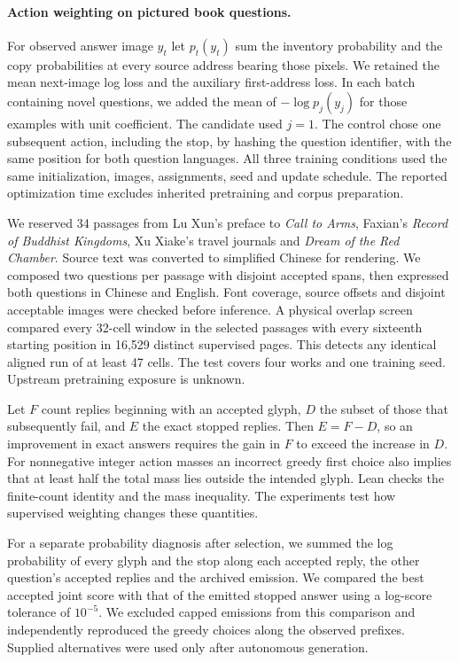 \paragraph{Action weighting on pictured book questions.}
For observed answer image $y_t$ let $p_t(y_t)$ sum the inventory probability and the copy probabilities at every source address bearing those pixels. We retained the mean next-image log loss and the auxiliary first-address loss. In each batch containing novel questions, we added the mean of $-\log p_j(y_j)$ for those examples with unit coefficient. The candidate used $j=1$. The control chose one subsequent action, including the stop, by hashing the question identifier, with the same position for both question languages. All three training conditions used the same initialization, images, assignments, seed and update schedule. The reported optimization time excludes inherited pretraining and corpus preparation.

We reserved 34 passages from Lu Xun's preface to \emph{Call to Arms}, Faxian's \emph{Record of Buddhist Kingdoms}, Xu Xiake's travel journals and \emph{Dream of the Red Chamber}. Source text was converted to simplified Chinese for rendering. We composed two questions per passage with disjoint accepted spans, then expressed both questions in Chinese and English. Font coverage, source offsets and disjoint acceptable images were checked before inference. A physical overlap screen compared every 32-cell window in the selected passages with every sixteenth starting position in 16,529 distinct supervised pages. This detects any identical aligned run of at least 47 cells. The test covers four works and one training seed. Upstream pretraining exposure is unknown.

Let $F$ count replies beginning with an accepted glyph, $D$ the subset of those that subsequently fail, and $E$ the exact stopped replies. Then $E=F-D$, so an improvement in exact answers requires the gain in $F$ to exceed the increase in $D$. For nonnegative integer action masses an incorrect greedy first choice also implies that at least half the total mass lies outside the intended glyph. Lean checks the finite-count identity and the mass inequality. The experiments test how supervised weighting changes these quantities.

For a separate probability diagnosis after selection, we summed the log probability of every glyph and the stop along each accepted reply, the other question's accepted replies and the archived emission. We compared the best accepted joint score with that of the emitted stopped answer using a log-score tolerance of $10^{-5}$. We excluded capped emissions from this comparison and independently reproduced the greedy choices along the observed prefixes. Supplied alternatives were used only after autonomous generation.
